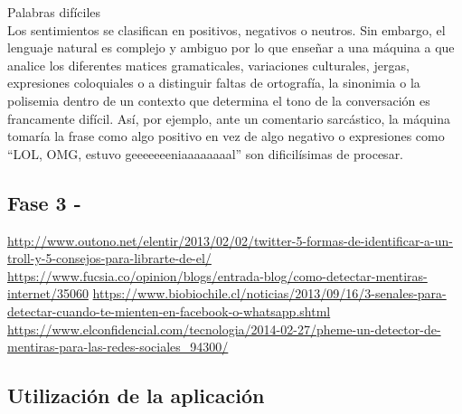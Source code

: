 \documentclass[../all.tex]{subfiles}
\begin{document}
    Palabras difíciles\\
    
    Los sentimientos se clasifican en positivos, negativos o neutros. Sin embargo, el lenguaje natural es complejo y ambiguo por lo que enseñar a una máquina a que analice los diferentes matices gramaticales, variaciones culturales, jergas, expresiones coloquiales o a distinguir faltas de ortografía, la sinonimia o la polisemia dentro de un contexto que determina el tono de la conversación es francamente difícil. Así, por ejemplo, ante un comentario sarcástico, la máquina tomaría la frase como algo positivo en vez de algo negativo o expresiones como “LOL, OMG, estuvo geeeeeeeniaaaaaaaal” son dificilísimas de procesar.

\newpage
\subsection{Fase 3 -}

\url{http://www.outono.net/elentir/2013/02/02/twitter-5-formas-de-identificar-a-un-troll-y-5-consejos-para-librarte-de-el/}
\url{https://www.fucsia.co/opinion/blogs/entrada-blog/como-detectar-mentiras-internet/35060}
\url{https://www.biobiochile.cl/noticias/2013/09/16/3-senales-para-detectar-cuando-te-mienten-en-facebook-o-whatsapp.shtml}
\url{https://www.elconfidencial.com/tecnologia/2014-02-27/pheme-un-detector-de-mentiras-para-las-redes-sociales_94300/}

\subsection{Utilización de la aplicación}
\end{document}
